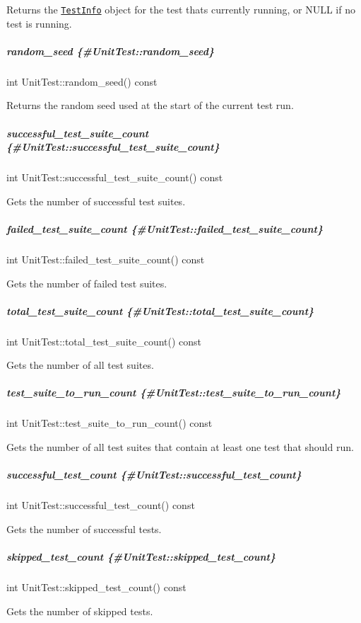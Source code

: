 Returns the \href{#TestInfo}{\tt {\ttfamily Test\+Info}} object for the test that\textquotesingle{}s currently running, or {\ttfamily N\+U\+LL} if no test is running.

\subparagraph*{random\+\_\+seed \{\#\+Unit\+Test\+::random\+\_\+seed\}}

{\ttfamily int Unit\+Test\+::random\+\_\+seed() const}

Returns the random seed used at the start of the current test run.

\subparagraph*{successful\+\_\+test\+\_\+suite\+\_\+count \{\#\+Unit\+Test\+::successful\+\_\+test\+\_\+suite\+\_\+count\}}

{\ttfamily int Unit\+Test\+::successful\+\_\+test\+\_\+suite\+\_\+count() const}

Gets the number of successful test suites.

\subparagraph*{failed\+\_\+test\+\_\+suite\+\_\+count \{\#\+Unit\+Test\+::failed\+\_\+test\+\_\+suite\+\_\+count\}}

{\ttfamily int Unit\+Test\+::failed\+\_\+test\+\_\+suite\+\_\+count() const}

Gets the number of failed test suites.

\subparagraph*{total\+\_\+test\+\_\+suite\+\_\+count \{\#\+Unit\+Test\+::total\+\_\+test\+\_\+suite\+\_\+count\}}

{\ttfamily int Unit\+Test\+::total\+\_\+test\+\_\+suite\+\_\+count() const}

Gets the number of all test suites.

\subparagraph*{test\+\_\+suite\+\_\+to\+\_\+run\+\_\+count \{\#\+Unit\+Test\+::test\+\_\+suite\+\_\+to\+\_\+run\+\_\+count\}}

{\ttfamily int Unit\+Test\+::test\+\_\+suite\+\_\+to\+\_\+run\+\_\+count() const}

Gets the number of all test suites that contain at least one test that should run.

\subparagraph*{successful\+\_\+test\+\_\+count \{\#\+Unit\+Test\+::successful\+\_\+test\+\_\+count\}}

{\ttfamily int Unit\+Test\+::successful\+\_\+test\+\_\+count() const}

Gets the number of successful tests.

\subparagraph*{skipped\+\_\+test\+\_\+count \{\#\+Unit\+Test\+::skipped\+\_\+test\+\_\+count\}}

{\ttfamily int Unit\+Test\+::skipped\+\_\+test\+\_\+count() const}

Gets the number of skipped tests.

